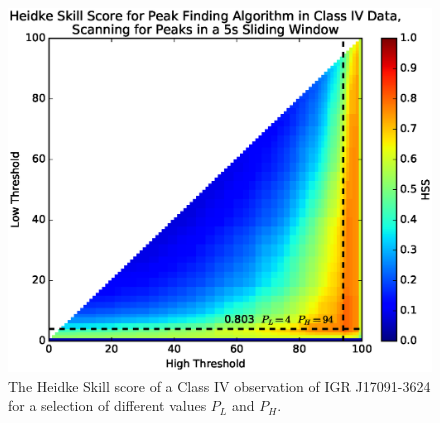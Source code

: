 \begin{figure}
    \includegraphics[width=\columnwidth, trim = 0mm 10mm 0mm 10mm]{images/HSS_J.eps}
    \captionsetup{singlelinecheck=off}
    \caption{The Heidke Skill score of a Class IV observation of IGR J17091-3624 for a selection of different values $P_L$ and $P_H$.}
   \label{fig:Heidke}
\end{figure}
